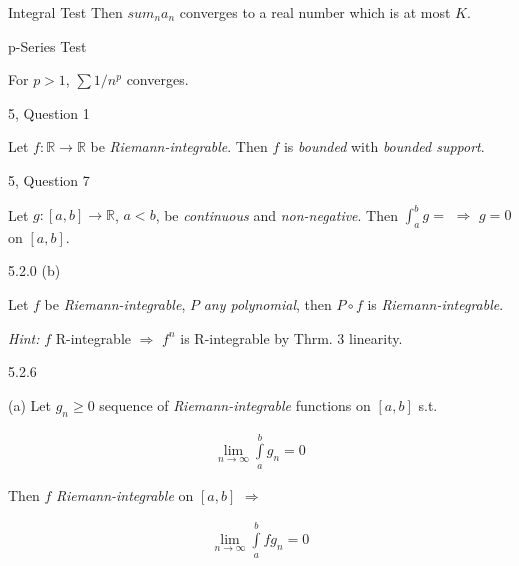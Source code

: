 \documentclass[10pt]{article} %
\newcommand{\cws}[2]{#1, Question #2}
\newcommand{\Hint}{\vspace{0.2em}\textit{Hint: }}
\renewcommand{\geq}{\geqslant}
\begin{document}
\begin{multicols}{3}
\begin{exercise}{}{Integral Test}
    Then $sum_n a_n$ converges to a real number which is at most $K$.

\end{exercise}

\begin{exercise}{}{p-Series Test}

    For $p > 1$, $\sum 1/n^p$ converges.

\end{exercise}

\begin{workshop}{\cws{5}{1}}{}

    Let $f: \mathbb{R} \to \mathbb{R}$ be \emph{Riemann-integrable}. Then $f$ is \emph{bounded} with \emph{bounded support}.

\end{workshop}

\begin{workshop}{\cws{5}{7}}{}

    Let $g: [a,b] \to \mathbb{R}$, $a < b$, be \emph{continuous} and \emph{non-negative}. Then $\int_a^b g = $ $\Rightarrow$ $g = 0$ on $[a,b]$.

\end{workshop}

\begin{exercise}{5.2.0 (b)}{}

    Let $f$ be \emph{Riemann-integrable}, $P$ \emph{any polynomial}, then $P \circ f$ is \emph{Riemann-integrable}.

    \Hint $f$ R-integrable $\Rightarrow$ $f^n$ is R-integrable by Thrm. 3 linearity.

\end{exercise}

\begin{exercise}{5.2.6}{}

    (a) Let $g_n \geq 0$ sequence of \emph{Riemann-integrable} functions on $[a,b]$ s.t.

        \begin{align*}
            \lim_{n \to \infty} \int\limits_a^b g_n = 0
        \end{align*}

    Then $f$ \emph{Riemann-integrable} on $[a,b]$ $\Rightarrow$ 

        \begin{align*}
            \lim_{n \to \infty} \int\limits_a^b fg_n = 0
        \end{align*}


\end{exercise}
\end{multicols}
\end{document}
